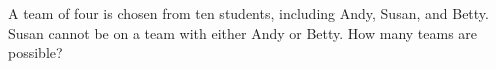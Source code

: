 A team of four is chosen from ten students, including Andy, Susan, and Betty. Susan cannot be on a team with either Andy or Betty. How many teams are possible?
